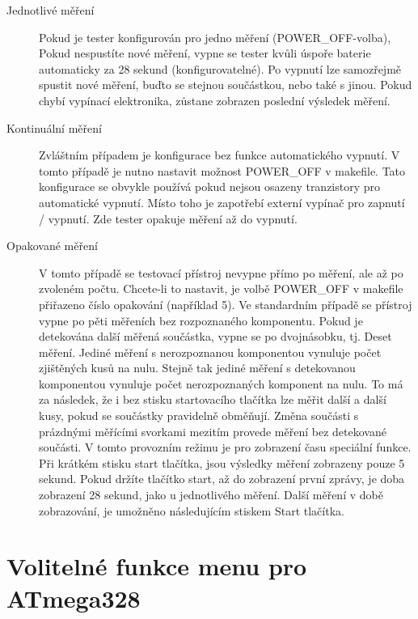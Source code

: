 \begin{description}
  \item[Jednotlivé měření] Pokud je tester konfigurován pro jedno měření (POWER\_OFF-volba),
Pokud nespustíte nové měření, vypne se tester kvůli úspoře baterie automaticky za 28 sekund (konfigurovatelné).
Po vypnutí lze samozřejmě spustit nové měření, buďto se stejnou součástkou, nebo také s jinou.
Pokud chybí vypínací elektronika, zůstane zobrazen poslední výsledek měření.
  \item[Kontinuální měření]  Zvláštním případem je konfigurace bez funkce automatického vypnutí.
V tomto případě je nutno nastavit možnost POWER\_OFF v makefile.
Tato konfigurace se obvykle používá pokud nejsou osazeny tranzistory pro automatické vypnutí.
Místo toho je zapotřebí externí vypínač pro zapnutí / vypnutí. Zde tester opakuje měření až do vypnutí.
  \item[Opakované měření] V tomto případě se testovací přístroj nevypne přímo po měření,
ale až po zvoleném počtu.
Chcete-li to nastavit, je volbě POWER\_OFF v makefile přiřazeno číslo opakování (například 5).
Ve standardním případě se přístroj vypne po pěti měřeních bez rozpoznaného komponentu.
Pokud je detekována další měřená součástka, vypne se po dvojnásobku, tj. Deset měření.
Jediné měření s nerozpoznanou komponentou vynuluje počet zjištěných kusů na nulu.
Stejně tak jediné měření s detekovanou komponentou vynuluje počet nerozpoznaných komponent na nulu.
To má za následek, že i bez stisku startovacího tlačítka lze měřit další a další kusy,
pokud se součástky pravidelně obměňují.
Změna součásti s prázdnými měřícími svorkami mezitím provede měření bez detekované součásti.
V tomto provozním režimu je pro zobrazení času speciální funkce.
Při krátkém stisku start tlačítka, jsou výsledky měření zobrazeny pouze 5 sekund.
Pokud držíte tlačítko start, až do zobrazení první zprávy, je doba zobrazení 28 sekund,
jako u jednotlivého měření.
Další měření v době zobrazování, je umožněno následujícím stiskem Start tlačítka.
\end{description}

\section{Volitelné funkce menu pro ATmega328}

